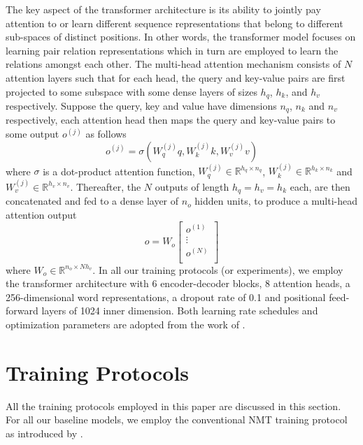 \documentclass[11pt,a4paper]{article}
\begin{document}
The key aspect of the transformer architecture is its ability to jointly pay attention to or learn different sequence representations that belong to different sub-spaces of distinct positions. In other words, the transformer model focuses on learning pair relation representations which in turn are employed to learn the relations amongst each other. The multi-head attention mechanism consists of $N$ attention layers such that for each head, the query and key-value pairs are first projected to some subspace with some dense layers of sizes $h_{q}$, $h_{k}$, and $h_{v}$ respectively. Suppose the query, key and value have dimensions $n_{q}$, $n_{k}$ and $n_{v}$ respectively, each attention head then maps the query and key-value pairs to some output $o^{(j)}$ as follows
\\
\begin{equation}
    o^{(j)} = \sigma(W^{(j)}_{q}q, W^{(j)}_{k}k, W^{(j)}_{v}v)
\end{equation}
where $\sigma $ is a dot-product attention function, $W^{(j)}_{q} \in \mathbb{R}^{h_{q} \times n_{q}}$, $W^{(j)}_{k} \in \mathbb{R}^{h_{k} \times n_{k}} $ and $W^{(j)}_{v} \in \mathbb{R}^{h_{v} \times n_{v}} $. Thereafter, the $N$ outputs of length $h_{q} = h_{v} = h_{k}$  each, are then concatenated and fed to a dense layer of $n_{o}$ hidden units, to produce a multi-head attention output
\begin{equation}
    o = W_{o}\begin{bmatrix}
o^{(1)}\\
\vdots\\
o^{(N)}\\
\end{bmatrix}
\end{equation}
where $W_{o} \in \mathbb{R}^{n_{o} \times Nh_{v}} $. In all our training protocols (or experiments), we employ the transformer architecture with 6 encoder-decoder blocks, 8 attention heads, a 256-dimensional word representations, a dropout rate of 0.1 and positional feed-forward layers of 1024 inner dimension. Both learning rate schedules and optimization parameters are adopted from the work of \citet{vaswani2017attention}.

\section{Training Protocols}\label{sec: training_protocols}
 All the training protocols employed in this paper are discussed in this section. For all our baseline models, we employ the conventional NMT training protocol as introduced by \citet{sutskever2014sequence}. 
\end{document}
